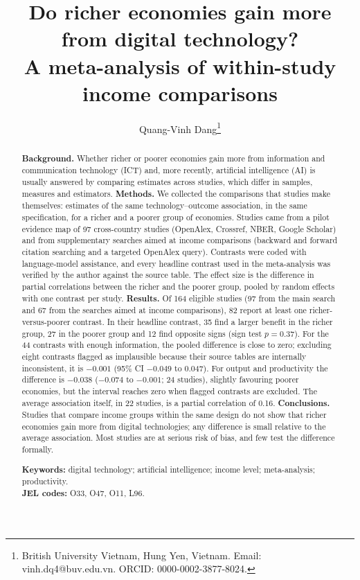 \documentclass[11pt,a4paper]{article}
\title{Do richer economies gain more from digital technology?\\ A meta-analysis of within-study income comparisons}
\author{Quang-Vinh Dang\thanks{British University Vietnam, Hung Yen, Vietnam. Email: vinh.dq4@buv.edu.vn. ORCID: 0000-0002-3877-8024.}}
\date{}
\begin{document}
\maketitle


\begin{abstract}
\noindent\textbf{Background.} Whether richer or poorer economies gain more from information and communication technology (ICT) and, more recently, artificial intelligence (AI) is usually answered by comparing estimates across studies, which differ in samples, measures and estimators. \textbf{Methods.} We collected the comparisons that studies make themselves: estimates of the same technology--outcome association, in the same specification, for a richer and a poorer group of economies. Studies came from a pilot evidence map of 97 cross-country studies (OpenAlex, Crossref, NBER, Google Scholar) and from supplementary searches aimed at income comparisons (backward and forward citation searching and a targeted OpenAlex query). Contrasts were coded with language-model assistance, and every headline contrast used in the meta-analysis was verified by the author against the source table. The effect size is the difference in partial correlations between the richer and the poorer group, pooled by random effects with one contrast per study. \textbf{Results.} Of 164 eligible studies (97 from the main search and 67 from the searches aimed at income comparisons), 82 report at least one richer-versus-poorer contrast. In their headline contrast, 35 find a larger benefit in the richer group, 27 in the poorer group and 12 find opposite signs (sign test $p = 0.37$). For the 44 contrasts with enough information, the pooled difference is close to zero; excluding eight contrasts flagged as implausible because their source tables are internally inconsistent, it is $-0.001$ (95\% CI $-0.049$ to 0.047). For output and productivity the difference is $-0.038$ ($-0.074$ to $-0.001$; 24 studies), slightly favouring poorer economies, but the interval reaches zero when flagged contrasts are excluded. The average association itself, in 22 studies, is a partial correlation of 0.16. \textbf{Conclusions.} Studies that compare income groups within the same design do not show that richer economies gain more from digital technologies; any difference is small relative to the average association. Most studies are at serious risk of bias, and few test the difference formally.
\par\medskip\noindent\textbf{Keywords:} digital technology; artificial intelligence; income level; meta-analysis; productivity.\\
\textbf{JEL codes:} O33, O47, O11, L96.
\end{abstract}
\end{document}
